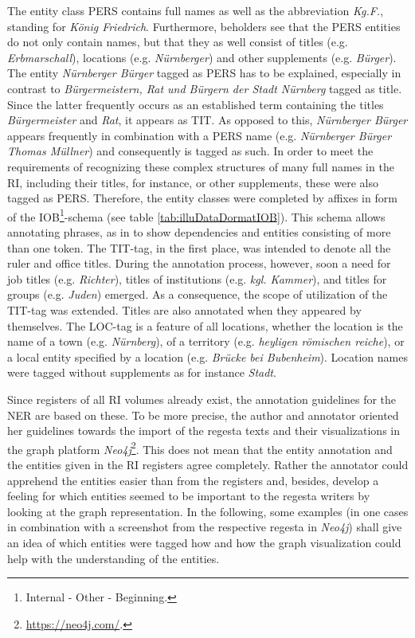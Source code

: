 \documentclass[11pt,a4paper]{article}
\begin{document}
The entity class PERS contains full names as well as the abbreviation \textit{Kg.F.}, standing for \textit{K{\"o}nig Friedrich}. Furthermore, beholders see that the PERS entities do not only contain names, but that they as well consist of titles (e.g. \textit{Erbmarschall}), locations (e.g. \textit{N{\"u}rnberger}) and other supplements (e.g. \textit{B{\"u}rger}). The entity \textit{N{\"u}rnberger B{\"u}rger} tagged as PERS has to be explained, especially in contrast to \textit{B{\"u}rgermeistern, Rat und B{\"u}rgern der Stadt N{\"u}rnberg} tagged as title. Since the latter frequently occurs as an established term containing the titles \textit{B{\"u}rgermeister} and \textit{Rat}, it appears as TIT. As opposed to this, \textit{N{\"u}rnberger B{\"u}rger} appears frequently in combination with a PERS name (e.g. \textit{N{\"u}rnberger B{\"u}rger Thomas M{\"u}llner}) and consequently is tagged as such. In order to meet the requirements of recognizing these complex structures of many full names in the RI, including their titles, for instance, or other supplements, these were also tagged as PERS. Therefore, the entity classes were completed by affixes in form of the IOB\footnote{Internal - Other - Beginning.}-schema (see table \ref{tab:illuDataDormatIOB}). This schema allows annotating phrases, as in to show dependencies and entities consisting of more than one token. The TIT-tag, in the first place, was intended to denote all the ruler and office titles. During the annotation process, however, soon a need for job titles (e.g. \textit{Richter}), titles of institutions (e.g. \textit{kgl. Kammer}), and titles for groups (e.g. \textit{Juden}) emerged. As a consequence, the scope of utilization of the TIT-tag was extended. Titles are also annotated when they appeared by themselves. The LOC-tag is a feature of all locations, whether the location is the name of a town (e.g. \textit{N{\"u}rnberg}), of a territory (e.g. \textit{heyligen r{\"o}mischen reiche}), or a local entity specified by a location (e.g. \textit{Br{\"u}cke bei Bubenheim}). Location names were tagged without supplements as for instance \textit{Stadt}.

Since registers of all RI volumes already exist, the annotation guidelines for the NER are based on these. To be more precise, the author and annotator oriented her guidelines towards the import of the regesta texts and their visualizations in the graph platform \textit{Neo4j}\footnote{\url{https://neo4j.com/}.}. This does not mean that the entity annotation and the entities given in the RI registers agree completely. Rather the annotator could apprehend the entities easier than from the registers and, besides, develop a feeling for which entities seemed to be important to the regesta writers by looking at the graph representation. In the following, some examples (in one cases in combination with a screenshot from the respective regesta in \textit{Neo4j}) shall give an idea of which entities were tagged how and how the graph visualization could help with the understanding of the entities.
\end{document}
